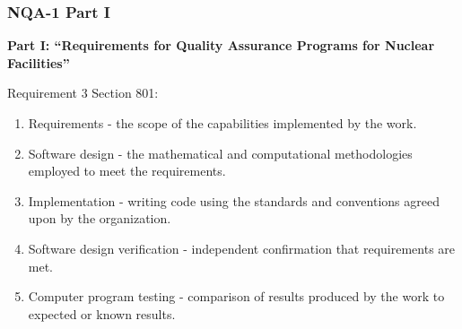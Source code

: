 \documentclass[12pt]{beamer}
\begin{document}
\begin{frame}
\frametitle{NQA-1 Part I}

{\bf Part I: ``Requirements for Quality Assurance Programs for Nuclear Facilities''}

Requirement 3 Section 801:
\begin{enumerate}
\item{\alert{Requirements} - the scope of the capabilities implemented by the work.}
\item{\alert{Software design} - the mathematical and computational methodologies employed to meet the requirements.}
\item{\alert{Implementation} - writing code using the standards and conventions agreed upon by the organization.}
\item{\alert{Software design verification} - independent confirmation that requirements are met.}
\item{\alert{Computer program testing} - comparison of results produced by the work to expected or known results.}
\end{enumerate}
\end{frame}
\end{document}
